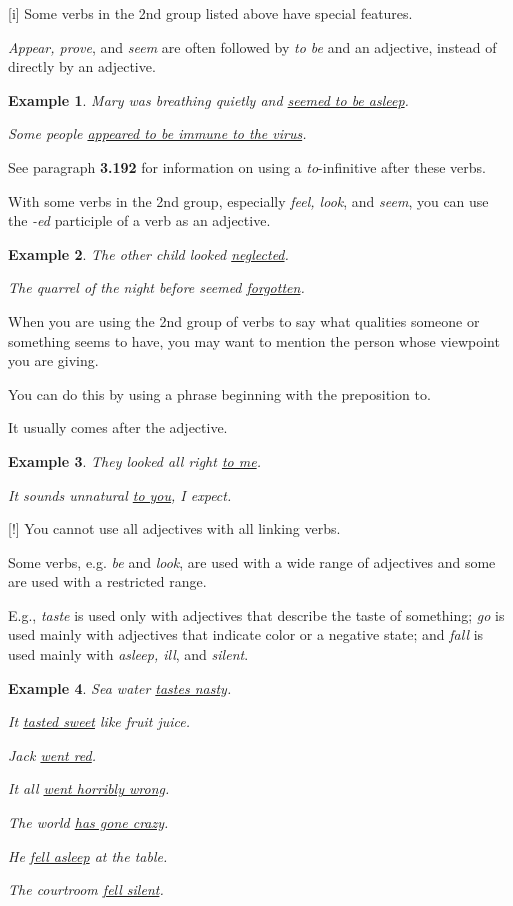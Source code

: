 \documentclass[oneside]{book}
\numberwithin{equation}{section}
\newtheorem{example}{Example}[section]
\begin{document}
%
\noindent{} [i] Some verbs in the 2nd group listed above have special features.

%
\textit{Appear, prove}, and \textit{seem} are often followed by \textit{to be} and an adjective, instead of directly by an adjective.
\begin{example}
    Mary was breathing quietly and \underline{seemed to be asleep}.
    
    Some people \underline{appeared to be immune to the virus}.
\end{example}
See paragraph \textbf{3.192} for information on using a \textit{to}-infinitive after these verbs.

%
\noindent{} With some verbs in the 2nd group, especially \textit{feel, look}, and \textit{seem}, you can use the \textit{-ed} participle of a verb as an adjective.
\begin{example}
    The other child looked \underline{neglected}.
    
    The quarrel of the night before seemed \underline{forgotten}.
\end{example}
%
\noindent{} When you are using the 2nd group of verbs to say what qualities someone or something seems to have, you may want to mention the person whose viewpoint you are giving.

You can do this by using a phrase beginning with the preposition to.

It usually comes after the adjective.
\begin{example}
    They looked all right \underline{to me}.
    
    It sounds unnatural \underline{to you}, I expect.
\end{example}
%
\noindent{} [!]  You cannot use all adjectives with all linking verbs.

Some verbs, e.g. \textit{be} and \textit{look}, are used with a wide range of adjectives and some are used with a restricted range.

E.g., \textit{taste} is used only with adjectives that describe the taste of something; \textit{go} is used mainly with adjectives that indicate color or a negative state; and \textit{fall} is used mainly with \textit{asleep, ill}, and \textit{silent}.
\begin{example}
    Sea water \underline{tastes nasty}.
    
    It \underline{tasted sweet} like fruit juice.
    
    Jack \underline{went red}.
    
    It all \underline{went horribly wrong}.
    
    The world \underline{has gone crazy}.
    
    He \underline{fell asleep} at the table.
    
    The courtroom \underline{fell silent}.
\end{example}
\end{document}
